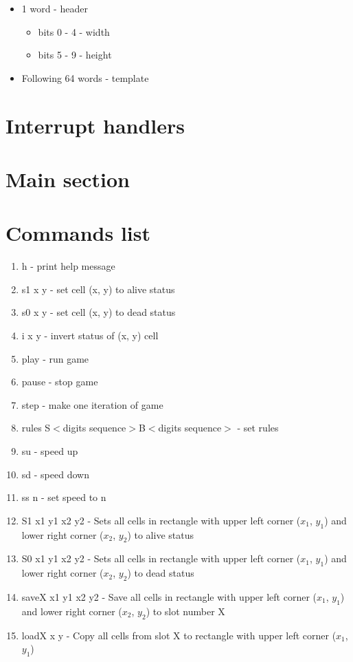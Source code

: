 \begin{itemize}
	\item 1 word - header
		\begin{itemize}
			\item bits 0 - 4 - width
			\item bits 5 - 9 - height
		\end{itemize}
	\item Following 64 words - template
\end{itemize}

\section*{Interrupt handlers}

\section*{Main section}

\section*{Commands list}

\begin{enumerate}
	\item \textsf{h} - print help message
	\item \textsf{s1 x y} - set cell (x, y) to alive status
	\item \textsf{s0 x y} - set cell (x, y) to dead status
	\item \textsf{i x y} - invert status of (x, y) cell
	\item \textsf{play} - run game
	\item \textsf{pause} - stop game
	\item \textsf{step} - make one iteration of game
	\item \textsf{rules S$<$digits sequence$>$B$<$digits sequence$>$} - set rules
	\item \textsf{su} - speed up
	\item \textsf{sd} - speed down
	\item \textsf{ss n} - set speed to n
	\item \textsf{S1 x1 y1 x2 y2} -  Sets all cells in rectangle with upper left corner ($x_{1}$, $y_{1}$) and lower right corner ($x_{2}$, $y_{2}$) to alive status
	\item \textsf{S0 x1 y1 x2 y2} -  Sets all cells in rectangle with upper left corner ($x_{1}$, $y_{1}$) and lower right corner ($x_{2}$, $y_{2}$) to dead status
	\item \textsf{saveX x1 y1 x2 y2} - Save all cells in rectangle with upper left corner ($x_{1}$, $y_{1}$) and lower right corner ($x_{2}$, $y_{2}$) to slot number X
	\item \textsf{loadX x y} - Copy all cells from slot X to rectangle with upper left corner ($x_{1}$, $y_{1}$)
\end{enumerate}

